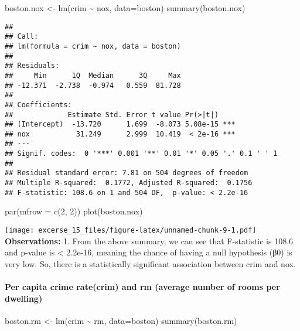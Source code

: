 \documentclass[
]{article}
\newenvironment{Shaded}{\begin{snugshade}}{\end{snugshade}}
\newcommand{\AttributeTok}[1]{\textcolor[rgb]{0.77,0.63,0.00}{#1}}
\newcommand{\DecValTok}[1]{\textcolor[rgb]{0.00,0.00,0.81}{#1}}
\newcommand{\FunctionTok}[1]{\textcolor[rgb]{0.00,0.00,0.00}{#1}}
\newcommand{\NormalTok}[1]{#1}
\newcommand{\OtherTok}[1]{\textcolor[rgb]{0.56,0.35,0.01}{#1}}
\newcommand{\SpecialCharTok}[1]{\textcolor[rgb]{0.00,0.00,0.00}{#1}}
\begin{document}
\begin{Shaded}
\begin{Highlighting}[]
\NormalTok{boston.nox }\OtherTok{\textless{}{-}} \FunctionTok{lm}\NormalTok{(crim }\SpecialCharTok{\textasciitilde{}}\NormalTok{ nox, }\AttributeTok{data=}\NormalTok{boston)}
\FunctionTok{summary}\NormalTok{(boston.nox)}
\end{Highlighting}
\end{Shaded}

\begin{verbatim}
## 
## Call:
## lm(formula = crim ~ nox, data = boston)
## 
## Residuals:
##     Min      1Q  Median      3Q     Max 
## -12.371  -2.738  -0.974   0.559  81.728 
## 
## Coefficients:
##             Estimate Std. Error t value Pr(>|t|)    
## (Intercept)  -13.720      1.699  -8.073 5.08e-15 ***
## nox           31.249      2.999  10.419  < 2e-16 ***
## ---
## Signif. codes:  0 '***' 0.001 '**' 0.01 '*' 0.05 '.' 0.1 ' ' 1
## 
## Residual standard error: 7.81 on 504 degrees of freedom
## Multiple R-squared:  0.1772, Adjusted R-squared:  0.1756 
## F-statistic: 108.6 on 1 and 504 DF,  p-value: < 2.2e-16
\end{verbatim}

\begin{Shaded}
\begin{Highlighting}[]
\FunctionTok{par}\NormalTok{(}\AttributeTok{mfrow =} \FunctionTok{c}\NormalTok{(}\DecValTok{2}\NormalTok{, }\DecValTok{2}\NormalTok{))}
\FunctionTok{plot}\NormalTok{(boston.nox)}
\end{Highlighting}
\end{Shaded}

\texttt{[image: excerse\_15\_files/figure-latex/unnamed-chunk-9-1.pdf]}
\textbf{Observations:} 1. From the above summary, we can see that
F-statistic is 108.6 and p-value is \textless{} 2.2e-16, meaning the
chance of having a null hypothesis (β0) is very low. So, there is a
statistically significant association between crim and nox.

\hypertarget{per-capita-crime-ratecrim-and-rm-average-number-of-rooms-per-dwelling}{%
\paragraph{Per capita crime rate(crim) and rm (average number of rooms
per
dwelling)}\label{per-capita-crime-ratecrim-and-rm-average-number-of-rooms-per-dwelling}}

\begin{Shaded}
\begin{Highlighting}[]
\NormalTok{boston.rm }\OtherTok{\textless{}{-}} \FunctionTok{lm}\NormalTok{(crim }\SpecialCharTok{\textasciitilde{}}\NormalTok{ rm, }\AttributeTok{data=}\NormalTok{boston)}
\FunctionTok{summary}\NormalTok{(boston.rm)}
\end{Highlighting}
\end{Shaded}
\end{document}
